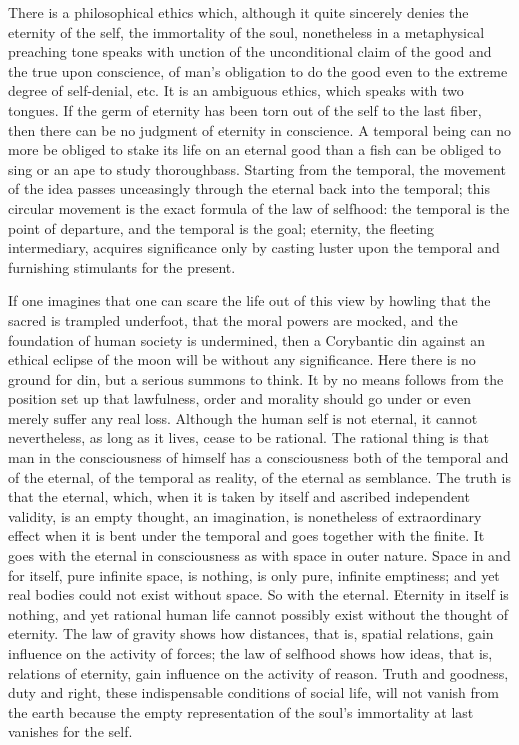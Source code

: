 \documentclass[12pt,a4paper,openany]{book}
\newcommand{\opage}[1]{\marginnote{\footnotesize\textit{[#1]}}}
\begin{document}
There is a philosophical ethics which, although it
quite sincerely denies the eternity of the self, the immortality of the soul,
nonetheless in a metaphysical preaching tone speaks with
unction of the unconditional claim of the good and the true upon
conscience, of man's obligation to do
the good even to the extreme degree of self-denial,
etc. It is an ambiguous ethics, which speaks with
two tongues. If the germ of eternity has been torn out of the self
to the last fiber, then there can be no judgment of eternity
in conscience. A temporal being can no
more be obliged to stake its life on an eternal
good than a fish can be obliged to sing or an
ape to study thoroughbass. Starting from the temporal, the
movement of the idea passes unceasingly through the eternal back into the
temporal; this circular movement is the exact
formula of the law of selfhood: the temporal is the point of departure, and the temporal
is the goal; eternity, the fleeting intermediary,
acquires significance only by casting luster upon the temporal
and furnishing stimulants for the present.

If one imagines that one can scare the life out of this
view by howling that the sacred is trampled
underfoot, that the moral powers are mocked, and the foundation
of human society is undermined, then a
Corybantic din against an ethical eclipse of the moon will be
without any significance. Here there is no ground for din,
but a serious summons to think. It by no means follows from the position set up that lawfulness, order
\setcounter{footnote}{0}%
\opage{204}and morality should go under or even merely suffer
any real loss. Although the human
self is not eternal, it cannot nevertheless, as long as it lives,
cease to be rational. The rational thing is that man
in the consciousness of himself has a consciousness both
of the temporal and of the eternal, of the temporal as
reality, of the eternal as semblance. The truth is that the
eternal, which, when it is taken by itself and ascribed independent validity,
is an empty thought, an imagination, is nonetheless
of extraordinary effect when it is bent under the
temporal and goes together with the finite. It goes
with the eternal in consciousness as with space in outer
nature. Space in and for itself, pure infinite
space, is nothing, is only pure, infinite emptiness;
and yet real bodies could not exist
without space. So with the eternal. Eternity in
itself is nothing, and yet rational human life
cannot possibly exist without the thought of eternity. The law of gravity
shows how distances, that is, spatial relations,
gain influence on the activity of forces; the law of selfhood
shows how ideas, that is, relations of eternity, gain
influence on the activity of reason. Truth and
goodness, duty and right, these indispensable conditions of social life,
will not vanish from the earth because the
empty representation of the soul's immortality at last vanishes
for the self.
\end{document}
